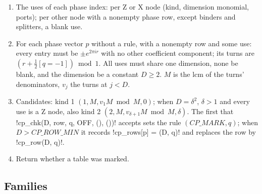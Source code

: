 {{{\begin{algorithm}\label{alg:lean-export-sym-compactrules}
\begin{enumerate}
\item The uses of each phase index: per Z or X node (kind, dimension monomial, ports); per other
node with a nonempty phase row, except binders and splitters, a blank use.
\item For each phase vector $p$ without a rule, with a nonempty row and some use: every entry
must be $\pm e^{2\pi i r}$ with no other coefficient component; its turns are
$(r + \tfrac12[q=-1]) \bmod 1$. All uses must share one dimension, none be blank, and the
dimension be a constant $D \ge 2$. $M$ is the lcm of the turns' denominators, $v_j$ the turns
at $j<D$.
\item Candidates: kind 1 $(1, M, v_1 M \bmod M, 0)$; when $D = \delta^2$, $\delta>1$ and every
use is a Z node, also kind 2 $(2, M, v_{\delta+1} M \bmod M, \delta)$. The first that
\lexpy!cp_chk(D, row, q, OFF, (), ())! accepts sets the rule $(\mathit{CP\_MARK}, q)$; when
$D > \mathit{CP\_ROW\_MIN}$ it records \lexpy!cp_rows[p] = (D, q)! and replaces the row by
\lexpy!cp_row(D, q)!.
\item Return whether a table was marked.
\end{enumerate}
\end{algorithm}

\subsection{Families}\label{sec:lean-export-sym-families}

}}}
